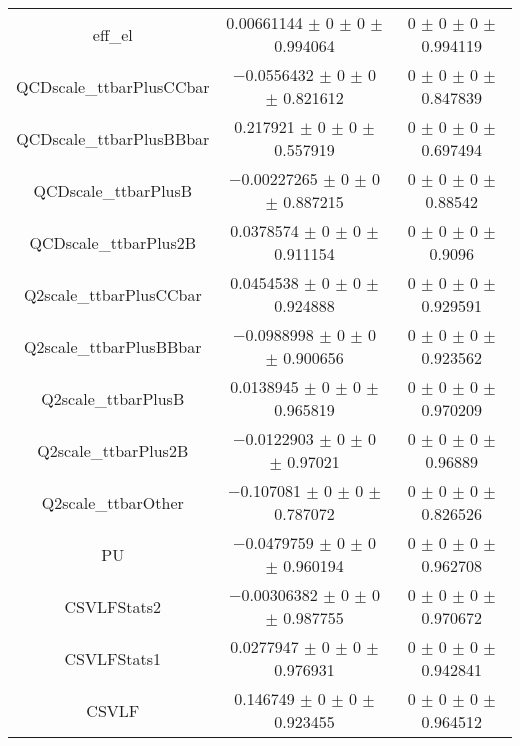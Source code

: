 \begin{table}
\begin{tabular}{ccc}
eff\_el 	& \num{0.00661144} $\pm$ \num{0} $\pm$ \num{0} $\pm$ \num{0.994064} 	& \num{0} $\pm$ \num{0} $\pm$ \num{0} $\pm$ \num{0.994119}\\
QCDscale\_ttbarPlusCCbar 	& \num{-0.0556432} $\pm$ \num{0} $\pm$ \num{0} $\pm$ \num{0.821612} 	& \num{0} $\pm$ \num{0} $\pm$ \num{0} $\pm$ \num{0.847839}\\
QCDscale\_ttbarPlusBBbar 	& \num{0.217921} $\pm$ \num{0} $\pm$ \num{0} $\pm$ \num{0.557919} 	& \num{0} $\pm$ \num{0} $\pm$ \num{0} $\pm$ \num{0.697494}\\
QCDscale\_ttbarPlusB 	& \num{-0.00227265} $\pm$ \num{0} $\pm$ \num{0} $\pm$ \num{0.887215} 	& \num{0} $\pm$ \num{0} $\pm$ \num{0} $\pm$ \num{0.88542}\\
QCDscale\_ttbarPlus2B 	& \num{0.0378574} $\pm$ \num{0} $\pm$ \num{0} $\pm$ \num{0.911154} 	& \num{0} $\pm$ \num{0} $\pm$ \num{0} $\pm$ \num{0.9096}\\
Q2scale\_ttbarPlusCCbar 	& \num{0.0454538} $\pm$ \num{0} $\pm$ \num{0} $\pm$ \num{0.924888} 	& \num{0} $\pm$ \num{0} $\pm$ \num{0} $\pm$ \num{0.929591}\\
Q2scale\_ttbarPlusBBbar 	& \num{-0.0988998} $\pm$ \num{0} $\pm$ \num{0} $\pm$ \num{0.900656} 	& \num{0} $\pm$ \num{0} $\pm$ \num{0} $\pm$ \num{0.923562}\\
Q2scale\_ttbarPlusB 	& \num{0.0138945} $\pm$ \num{0} $\pm$ \num{0} $\pm$ \num{0.965819} 	& \num{0} $\pm$ \num{0} $\pm$ \num{0} $\pm$ \num{0.970209}\\
Q2scale\_ttbarPlus2B 	& \num{-0.0122903} $\pm$ \num{0} $\pm$ \num{0} $\pm$ \num{0.97021} 	& \num{0} $\pm$ \num{0} $\pm$ \num{0} $\pm$ \num{0.96889}\\
Q2scale\_ttbarOther 	& \num{-0.107081} $\pm$ \num{0} $\pm$ \num{0} $\pm$ \num{0.787072} 	& \num{0} $\pm$ \num{0} $\pm$ \num{0} $\pm$ \num{0.826526}\\
PU 	& \num{-0.0479759} $\pm$ \num{0} $\pm$ \num{0} $\pm$ \num{0.960194} 	& \num{0} $\pm$ \num{0} $\pm$ \num{0} $\pm$ \num{0.962708}\\
CSVLFStats2 	& \num{-0.00306382} $\pm$ \num{0} $\pm$ \num{0} $\pm$ \num{0.987755} 	& \num{0} $\pm$ \num{0} $\pm$ \num{0} $\pm$ \num{0.970672}\\
CSVLFStats1 	& \num{0.0277947} $\pm$ \num{0} $\pm$ \num{0} $\pm$ \num{0.976931} 	& \num{0} $\pm$ \num{0} $\pm$ \num{0} $\pm$ \num{0.942841}\\
CSVLF 	& \num{0.146749} $\pm$ \num{0} $\pm$ \num{0} $\pm$ \num{0.923455} 	& \num{0} $\pm$ \num{0} $\pm$ \num{0} $\pm$ \num{0.964512}\\

\end{tabular}
\end{table}
